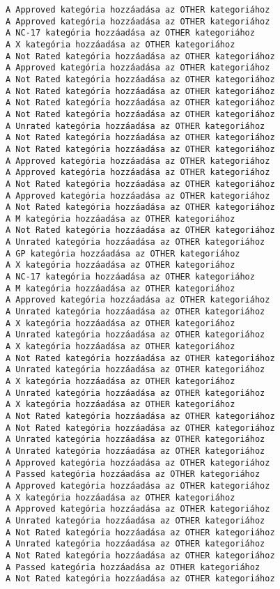 \documentclass[11pt]{article}
\begin{document}
\begin{Verbatim}[commandchars=\\\{\}]
A Approved kategória hozzáadása az OTHER kategoriához
A Approved kategória hozzáadása az OTHER kategoriához
A NC-17 kategória hozzáadása az OTHER kategoriához
A X kategória hozzáadása az OTHER kategoriához
A Not Rated kategória hozzáadása az OTHER kategoriához
A Approved kategória hozzáadása az OTHER kategoriához
A Not Rated kategória hozzáadása az OTHER kategoriához
A Not Rated kategória hozzáadása az OTHER kategoriához
A Not Rated kategória hozzáadása az OTHER kategoriához
A Not Rated kategória hozzáadása az OTHER kategoriához
A Unrated kategória hozzáadása az OTHER kategoriához
A Not Rated kategória hozzáadása az OTHER kategoriához
A Not Rated kategória hozzáadása az OTHER kategoriához
A Approved kategória hozzáadása az OTHER kategoriához
A Approved kategória hozzáadása az OTHER kategoriához
A Not Rated kategória hozzáadása az OTHER kategoriához
A Approved kategória hozzáadása az OTHER kategoriához
A Not Rated kategória hozzáadása az OTHER kategoriához
A M kategória hozzáadása az OTHER kategoriához
A Not Rated kategória hozzáadása az OTHER kategoriához
A Unrated kategória hozzáadása az OTHER kategoriához
A GP kategória hozzáadása az OTHER kategoriához
A X kategória hozzáadása az OTHER kategoriához
A NC-17 kategória hozzáadása az OTHER kategoriához
A M kategória hozzáadása az OTHER kategoriához
A Approved kategória hozzáadása az OTHER kategoriához
A Unrated kategória hozzáadása az OTHER kategoriához
A X kategória hozzáadása az OTHER kategoriához
A Unrated kategória hozzáadása az OTHER kategoriához
A X kategória hozzáadása az OTHER kategoriához
A Not Rated kategória hozzáadása az OTHER kategoriához
A Unrated kategória hozzáadása az OTHER kategoriához
A X kategória hozzáadása az OTHER kategoriához
A Unrated kategória hozzáadása az OTHER kategoriához
A X kategória hozzáadása az OTHER kategoriához
A Not Rated kategória hozzáadása az OTHER kategoriához
A Not Rated kategória hozzáadása az OTHER kategoriához
A Unrated kategória hozzáadása az OTHER kategoriához
A Unrated kategória hozzáadása az OTHER kategoriához
A Approved kategória hozzáadása az OTHER kategoriához
A Passed kategória hozzáadása az OTHER kategoriához
A Approved kategória hozzáadása az OTHER kategoriához
A X kategória hozzáadása az OTHER kategoriához
A Approved kategória hozzáadása az OTHER kategoriához
A Unrated kategória hozzáadása az OTHER kategoriához
A Not Rated kategória hozzáadása az OTHER kategoriához
A Unrated kategória hozzáadása az OTHER kategoriához
A Not Rated kategória hozzáadása az OTHER kategoriához
A Passed kategória hozzáadása az OTHER kategoriához
A Not Rated kategória hozzáadása az OTHER kategoriához

\end{Verbatim}
\end{document}
